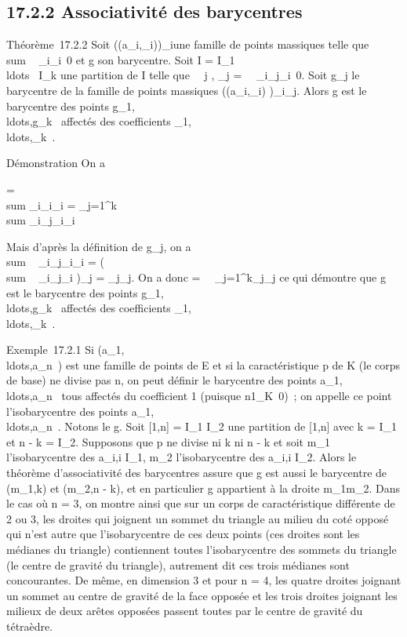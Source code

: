 \documentclass[]{article}
\begin{document}
\subsection{17.2.2 Associativité des barycentres}

Théorème~17.2.2 Soit \left
((a_i,\lambda_i)\right )_i\inI une
famille de points massiques telle que
\\sum ~
_i\inI\lambda_i\neq~0 et g son
barycentre. Soit I = I_1
\cup\\ldots~ \cup
I_k une partition de I telle que \forall~~j \in
[1,k], \mu_j =\
\sum ~
_i\inI_j\lambda_i\neq~0. Soit
g_j le barycentre de la famille de points massiques
\left ((a_i,\lambda_i)\right
)_i\inI_j. Alors g est le barycentre des points
g_1,\\ldots,g_k~
affectés des coefficients
\mu_1,\\ldots,\mu_k~.

Démonstration On a

 = \\sum
_i\inI\lambda_i\overrightarrowga_i
= \sum _j=1^k~
\\sum
_i\inI_j\lambda_i\overrightarrowga_i

Mais d'après la définition de g_j, on a
\\sum ~
_i\inI_j\lambda_i\overrightarrowga_i
= \left
(\\sum ~
_i\inI_j\lambda_i\right
)\overrightarrowgg_j =
\mu_j\overrightarrowgg_j. On a donc
 =\
\sum ~
_j=1^k\mu_j\overrightarrowgg_j
ce qui démontre que g est le barycentre des points
g_1,\\ldots,g_k~
affectés des coefficients
\mu_1,\\ldots,\mu_k~.

Exemple~17.2.1 Si
(a_1,\\ldots,a_n~)
est une famille de points de E et si la caractéristique p de K (le corps
de base) ne divise pas n, on peut définir le barycentre des points
a_1,\\ldots,a_n~
tous affectés du coefficient 1 (puisque
n1_K\neq~0)~; on appelle ce point
l'isobarycentre des points
a_1,\\ldots,a_n~.
Notons le g. Soit [1,n] = I_1 \cup I_2 une partition
de [1,n] avec k = I_1 et n - k =
I_2. Supposons que p ne divise ni k ni n -
k et soit m_1 l'isobarycentre des a_i,i \in
I_1, m_2 l'isobarycentre des a_i,i \in
I_2. Alors le théorème d'associativité des barycentres assure
que g est aussi le barycentre de (m_1,k) et (m_2,n -
k), et en particulier g appartient à la droite m_1m_2.
Dans le cas où n = 3, on montre ainsi que sur un corps de
caractéristique différente de 2 ou 3, les droites qui joignent un sommet
du triangle au milieu du coté opposé qui n'est autre que l'isobarycentre
de ces deux points (ces droites sont les médianes du triangle)
contiennent toutes l'isobarycentre des sommets du triangle (le centre de
gravité du triangle), autrement dit ces trois médianes sont
concourantes. De même, en dimension 3 et pour n = 4, les quatre droites
joignant un sommet au centre de gravité de la face opposée et les trois
droites joignant les milieux de deux arêtes opposées passent toutes par
le centre de gravité du tétraèdre.
\end{document}
